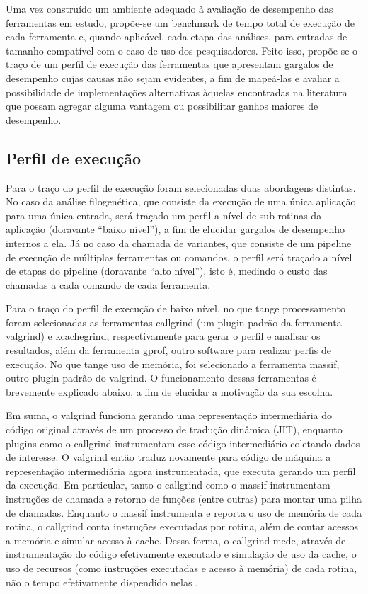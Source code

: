 \documentclass[cic,tc]{iiufrgs}
\begin{document}
Uma vez construído um ambiente adequado à avaliação de desempenho das
ferramentas em estudo, propõe-se um benchmark de tempo total de execução de
cada ferramenta e, quando aplicável, cada etapa das análises, para entradas de
tamanho compatível com o caso de uso dos pesquisadores. Feito isso, propõe-se o
traço de um perfil de execução das ferramentas que apresentam gargalos de
desempenho cujas causas não sejam evidentes, a fim de mapeá-las e avaliar a
possibilidade de implementações alternativas àquelas encontradas na literatura
que possam agregar alguma vantagem ou possibilitar ganhos maiores de
desempenho.

\subsection{Perfil de execução}

Para o traço do perfil de execução foram selecionadas duas abordagens
distintas. No caso da análise filogenética, que consiste da execução de uma
única aplicação para uma única entrada, será traçado um perfil a nível de
sub-rotinas da aplicação (doravante ``baixo nível''), a fim de elucidar gargalos
de desempenho internos a ela. Já no caso da chamada de variantes, que consiste
de um pipeline de execução de múltiplas ferramentas ou comandos, o perfil será
traçado a nível de etapas do pipeline (doravante ``alto nível''), isto é,
medindo o custo das chamadas a cada comando de cada ferramenta.

Para o traço do perfil de execução de baixo nível, no que tange processamento
foram selecionadas as ferramentas callgrind (um plugin padrão da ferramenta
valgrind) e kcachegrind, respectivamente para gerar o perfil e analisar os
resultados, além da ferramenta gprof, outro software para realizar perfis de
execução. No que tange uso de memória, foi selecionado a ferramenta massif,
outro plugin padrão do valgrind. O funcionamento dessas ferramentas é
brevemente explicado abaixo, a fim de elucidar a motivação da sua escolha.

Em suma, o valgrind funciona gerando uma representação intermediária do código
original através de um processo de tradução dinâmica (JIT), enquanto plugins
como o callgrind instrumentam esse código intermediário coletando dados de
interesse. O valgrind então traduz novamente para código de máquina a
representação intermediária agora instrumentada, que executa gerando um perfil
da execução. Em particular, tanto o callgrind como o massif instrumentam
instruções de chamada e retorno de funções (entre outras) para montar uma pilha
de chamadas. Enquanto o massif instrumenta e reporta o uso de memória de cada
rotina, o callgrind conta instruções executadas por rotina, além de contar
acessos a memória e simular acesso à cache. Dessa forma, o callgrind mede,
através de instrumentação do código efetivamente executado e simulação de uso
da cache, o uso de recursos (como instruções executadas e acesso à memória) de
cada rotina, não o tempo efetivamente dispendido
nelas \cite{weidendorfer2008sequential}.
\end{document}
